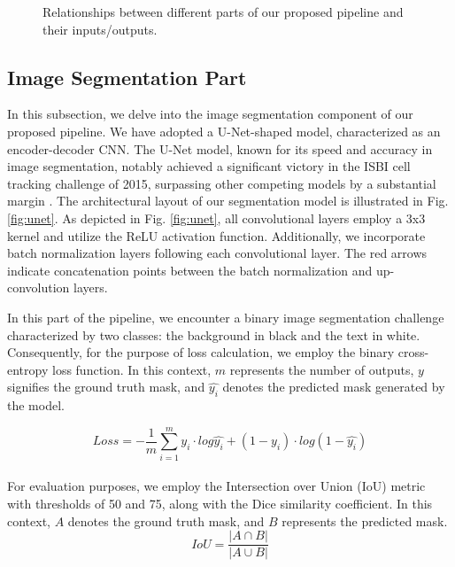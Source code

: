 \documentclass[conference]{IEEEtran}
\begin{document}
\begin{figure}[h] 
\caption{Relationships between different parts of our proposed pipeline and their inputs/outputs.}
\label{fig:block-diagram}
\end{figure}  


\subsection{Image Segmentation Part}
In this subsection, we delve into the image segmentation component of our proposed pipeline. We have adopted a U-Net-shaped model, characterized as an encoder-decoder CNN. The U-Net model, known for its speed and accuracy in image segmentation, notably achieved a significant victory in the ISBI cell tracking challenge of 2015, surpassing other competing models by a substantial margin \cite{15}. The architectural layout of our segmentation model is illustrated in Fig. \ref{fig:unet}.
As depicted in Fig. \ref{fig:unet}, all convolutional layers employ a 3x3 kernel and utilize the ReLU activation function. Additionally, we incorporate batch normalization layers following each convolutional layer. The red arrows indicate concatenation points between the batch normalization and up-convolution layers.

\begin{figure*}[t] 
\caption{The architecture of the image segmentation model includes the relationship of layers, the number of output filters in the convolution layers, and the type of other layers.}
\label{fig:unet}
\end{figure*}  

In this part of the pipeline, we encounter a binary image segmentation challenge characterized by two classes: the background in black and the text in white. Consequently, for the purpose of loss calculation, we employ the binary cross-entropy loss function. In this context, $m$ represents the number of outputs, $y$ signifies the ground truth mask, and $\hat{y_i}$ denotes the predicted mask generated by the model.

\begin{equation}\label{eq1}
Loss = - \frac{1}{m} \sum_{i=1} ^ m y_i \cdot  log \hat {y_{i}} + (1 - y_i) \cdot log(1 - \hat{y_i})
\end{equation}
\\
For evaluation purposes, we employ the Intersection over Union (IoU) metric with thresholds of 50 and 75, along with the Dice similarity coefficient. In this context, $A$ denotes the ground truth mask, and $B$ represents the predicted mask.
\begin{equation}\label{eq2}
IoU = \frac{|A \cap B|}{|A \cup B|}
\end{equation}
\end{document}
